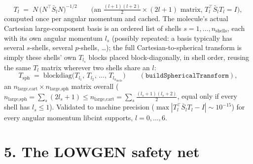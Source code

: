 \documentclass[11pt]{article}
\begin{document}
\begin{equation}
T_l \;=\; N\,\big(N^{\!\top} \bar S_l N\big)^{-1/2}
\qquad\Big(\text{an } \tfrac{(l+1)(l+2)}2 \times (2l+1) \text{ matrix, } T_l^{\!\top} \bar S_l T_l = I\Big),
\end{equation}
computed once per angular momentum and cached. The molecule's actual Cartesian large-component
basis is an ordered list of shells $s=1,\dots,n_{\text{shells}}$, each with its own angular momentum
$l_s$ (possibly repeated: a basis typically has several $s$-shells, several $p$-shells, \ldots);
the full Cartesian-to-spherical transform is simply these shells' own $T_{l_s}$ blocks placed
block-diagonally, in shell order, reusing the same $T_l$ matrix wherever two shells share an $l$:
\begin{equation}
T_{\text{sph}} \;=\; \mathrm{blockdiag}\big(T_{l_1},\,T_{l_2},\,\dots,\,T_{l_{n_{\text{shells}}}}\big)
\qquad(\texttt{buildSphericalTransform}),
\end{equation}
an $n_{\text{large,cart}}\times n_{\text{large,sph}}$ matrix overall
($n_{\text{large,sph}}=\sum_s(2l_s+1) \le n_{\text{large,cart}}=\sum_s\tfrac{(l_s+1)(l_s+2)}2$, equal
only if every shell has $l_s\le1$). Validated to machine precision
($\max|T_l^{\!\top}\bar S_lT_l-I|\sim10^{-15}$) for every angular momentum libcint supports,
$l=0,\dots,6$.

\section*{5. The LOWGEN safety net}
\end{document}
